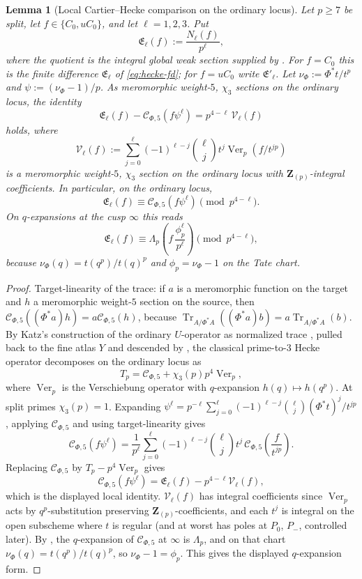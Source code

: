 \documentclass[11pt]{amsart}
\newtheorem{lemma}[theorem]{Lemma}
\theoremstyle{definition}
\theoremstyle{remark}
\newcommand{\Z}{\mathbf{Z}}
\newcommand{\Tr}{\operatorname{Tr}}
\begin{document}
\begin{lemma}[Local Cartier--Hecke comparison on the ordinary locus]\label{lem:cartier-hecke-local}
Let $p\ge 7$ be split, let $f\in\{C_0,uC_0\}$, and let $\ell=1,2,3$. Put
\[
\mathfrak E_\ell(f):=\frac{N_\ell(f)}{p^\ell},
\]
where the quotient is the integral global weak section supplied by . For $f=C_0$ this is the finite difference $\mathfrak E_\ell$ of \eqref{eq:hecke-fd}; for $f=uC_0$ write $\mathfrak E'_\ell$.
Let $\nu_\Phi:=\Phi^*t/t^p$ and $\psi:=(\nu_\Phi-1)/p$. As meromorphic weight-$5$, $\chi_3$ sections on the ordinary locus, the identity
\[
\mathfrak E_\ell(f)-\mathcal C_{\Phi,5}(f\psi^\ell)=p^{4-\ell}\,\mathcal V_\ell(f)
\]
holds, where
\[
\mathcal V_\ell(f):=\sum_{j=0}^\ell(-1)^{\ell-j}\binom{\ell}{j}t^j\operatorname{Ver}_p(f/t^{jp})
\]
is a meromorphic weight-$5$, $\chi_3$ section on the ordinary locus with $\Z_{(p)}$-integral coefficients. In particular, on the ordinary locus,
\[
\mathfrak E_\ell(f)\equiv\mathcal C_{\Phi,5}(f\psi^\ell)\pmod{p^{4-\ell}}.
\]
On $q$-expansions at the cusp $\infty$ this reads
\[
\mathfrak E_\ell(f)\equiv\Lambda_p\!\left(f\,\frac{\phi_p^\ell}{p^\ell}\right)\pmod{p^{4-\ell}},
\]
because $\nu_\Phi(q)=t(q^p)/t(q)^p$ and $\phi_p=\nu_\Phi-1$ on the Tate chart.
\end{lemma}

\begin{proof}
Target-linearity of the trace: if $a$ is a meromorphic function on the target and $h$ a meromorphic weight-$5$ section on the source, then $\mathcal C_{\Phi,5}((\Phi^*a)h)=a\mathcal C_{\Phi,5}(h)$, because $\Tr_{A/\Phi^*A}((\Phi^*a)b)=a\Tr_{A/\Phi^*A}(b)$. By Katz's construction of the ordinary $U$-operator as normalized trace \cite[\S 3.11]{Katz-padic}, pulled back to the fine atlas $Y$ and descended by , the classical prime-to-$3$ Hecke operator decomposes on the ordinary locus as
\[
T_p=\mathcal C_{\Phi,5}+\chi_3(p)p^4\operatorname{Ver}_p,
\]
where $\operatorname{Ver}_p$ is the Verschiebung operator with $q$-expansion $h(q)\mapsto h(q^p)$. At split primes $\chi_3(p)=1$. Expanding $\psi^\ell=p^{-\ell}\sum_{j=0}^\ell(-1)^{\ell-j}\binom{\ell}{j}(\Phi^*t)^j/t^{jp}$, applying $\mathcal C_{\Phi,5}$ and using target-linearity gives
\[
\mathcal C_{\Phi,5}(f\psi^\ell)=\frac{1}{p^\ell}\sum_{j=0}^\ell(-1)^{\ell-j}\binom{\ell}{j}t^j\,\mathcal C_{\Phi,5}\!\left(\frac{f}{t^{jp}}\right).
\]
Replacing $\mathcal C_{\Phi,5}$ by $T_p-p^4\operatorname{Ver}_p$ gives
\[
\mathcal C_{\Phi,5}(f\psi^\ell)=\mathfrak E_\ell(f)-p^{4-\ell}\mathcal V_\ell(f),
\]
which is the displayed local identity. $\mathcal V_\ell(f)$ has integral coefficients since $\operatorname{Ver}_p$ acts by $q^p$-substitution preserving $\Z_{(p)}$-coefficients, and each $t^j$ is integral on the open subscheme where $t$ is regular (and at worst has poles at $P_0$, $P_-$, controlled later). By , the $q$-expansion of $\mathcal C_{\Phi,5}$ at $\infty$ is $\Lambda_p$, and on that chart $\nu_\Phi(q)=t(q^p)/t(q)^p$, so $\nu_\Phi-1=\phi_p$. This gives the displayed $q$-expansion form.
\end{proof}
\end{document}
